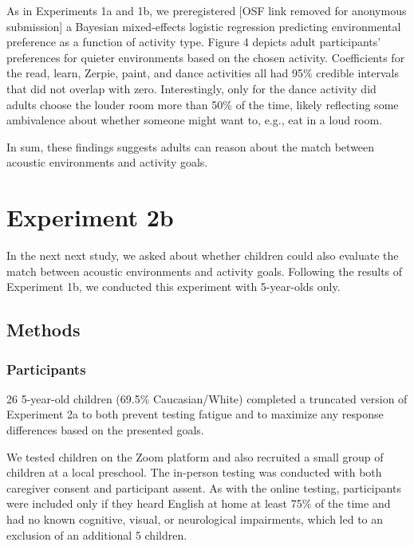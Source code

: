 \documentclass[10pt, letterpaper]{article}
\begin{document}
As in Experiments 1a and 1b, we preregistered {[}OSF link removed for
anonymous submission{]} a Bayesian mixed-effects logistic regression
predicting environmental preference as a function of activity type.
Figure 4 depicts adult participants' preferences for quieter
environments based on the chosen activity. Coefficients for the read,
learn, Zerpie, paint, and dance activities all had 95\% credible
intervals that did not overlap with zero. Interestingly, only for the
dance activity did adults choose the louder room more than 50\% of the
time, likely reflecting some ambivalence about whether someone might
want to, e.g., eat in a loud room.

In sum, these findings suggests adults can reason about the match
between acoustic environments and activity goals.

\hypertarget{experiment-2b}{%
\section{Experiment 2b}\label{experiment-2b}}

In the next next study, we asked about whether children could also
evaluate the match between acoustic environments and activity goals.
Following the results of Experiment 1b, we conducted this experiment
with 5-year-olds only.

\hypertarget{methods-3}{%
\subsection{Methods}\label{methods-3}}

\hypertarget{participants-3}{%
\subsubsection{Participants}\label{participants-3}}

26 5-year-old children (69.5\% Caucasian/White) completed a truncated
version of Experiment 2a to both prevent testing fatigue and to maximize
any response differences based on the presented goals.

We tested children on the Zoom platform and also recruited a small group
of children at a local preschool. The in-person testing was conducted
with both caregiver consent and participant assent. As with the online
testing, participants were included only if they heard English at home
at least 75\% of the time and had no known cognitive, visual, or
neurological impairments, which led to an exclusion of an additional 5
children.
\end{document}
